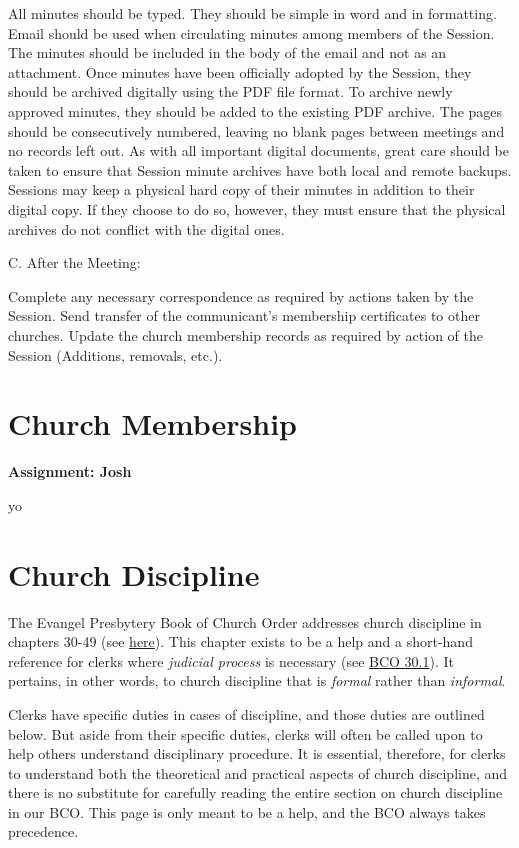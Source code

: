 \documentclass[
]{book}
\begin{document}
All minutes should be typed. They should be simple in word and in formatting. Email should be used when circulating minutes among members of the Session. The minutes should be included in the body of the email and not as an attachment. Once minutes have been officially adopted by the Session, they should be archived digitally using the PDF file format. To archive newly approved minutes, they should be added to the existing PDF archive. The pages should be consecutively numbered, leaving no blank pages between meetings and no records left out. As with all important digital documents, great care should be taken to ensure that Session minute archives have both local and remote backups. Sessions may keep a physical hard copy of their minutes in addition to their digital copy. If they choose to do so, however, they must ensure that the physical archives do not conflict with the digital ones.

C. After the Meeting:

Complete any necessary correspondence as required by actions taken by the Session.
Send transfer of the communicant's membership certificates to other churches.
Update the church membership records as required by action of the Session (Additions, removals, etc.).

\hypertarget{church-membership}{%
\chapter{Church Membership}\label{church-membership}}

\textbf{Assignment: Josh}

yo

\hypertarget{church-discipline}{%
\chapter{Church Discipline}\label{church-discipline}}

The Evangel Presbytery Book of Church Order addresses church discipline in chapters 30-49 (see \href{https://evangel.pressbooks.com/chapter/30-discipline-its-nature-subjects-and-ends/}{here}). This chapter exists to be a help and a short-hand reference for clerks where \emph{judicial process} is necessary (see \href{https://evangel.pressbooks.com/chapter/30-discipline-its-nature-subjects-and-ends/}{BCO 30.1}). It pertains, in other words, to church discipline that is \emph{formal} rather than \emph{informal}.

Clerks have specific duties in cases of discipline, and those duties are outlined below. But aside from their specific duties, clerks will often be called upon to help others understand disciplinary procedure. It is essential, therefore, for clerks to understand both the theoretical and practical aspects of church discipline, and there is no substitute for carefully reading the entire section on church discipline in our BCO. This page is only meant to be a help, and the BCO always takes precedence.
\end{document}
